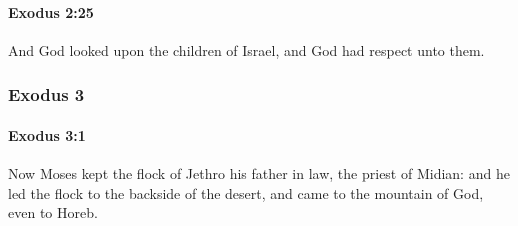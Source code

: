 		\paragraph{Exodus 2:25} %
			\label{EXODUS-2-25}

			And God looked upon the children of Israel, and God had respect unto them.

	\subsubsection{Exodus 3} %
		\label{EXODUS-3}

		\paragraph{Exodus 3:1} %
			\label{EXODUS-3-1}

			Now Moses kept the flock of Jethro his father in law, the priest of Midian: and he led the flock to the backside of the desert, and came to the mountain of God, even to Horeb.

